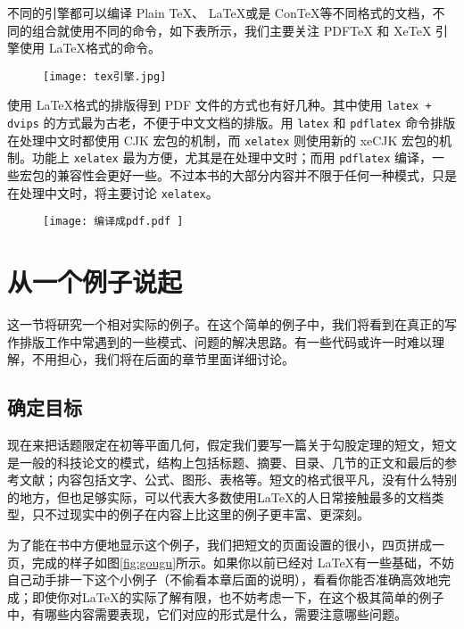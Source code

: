 {    \qquad 不同的引擎都可以编译 Plain \TeX 、 \LaTeX 或是 Con\TeX 等不同格式的文档，不同的组合就使用不同的命令，如下表所示，我们主要关注 PDFTeX 和 XeTeX 引擎使用 \LaTeX 格式的命令。

    \begin{figure}[H]
        \centering
        \texttt{[image: tex引擎.jpg]}
    \end{figure}

    \qquad 使用 \LaTeX 格式的排版得到 PDF 文件的方式也有好几种。其中使用 \lstinline{latex + dvips} 的方式最为古老，不便于中文文档的排版。用 \lstinline{latex} 和 \lstinline{pdflatex} 命令排版在处理中文时都使用 CJK 宏包的机制，而 \lstinline{xelatex} 则使用新的 xeCJK 宏包的机制。功能上 \lstinline{xelatex} 最为方便，尤其是在处理中文时；而用 \lstinline{pdflatex} 编译，一些宏包的兼容性会更好一些。不过本书的大部分内容并不限于任何一种模式，只是在处理中文时，将主要讨论 \lstinline{xelatex}。

    \begin{figure}[H]
        \centering
        \texttt{[image: 编译成pdf.pdf ]}
    \end{figure}
}

\section{从一个例子说起}

这一节将研究一个相对实际的例子。在这个简单的例子中，我们将看到在真正的写作排版工作中常遇到的一些模式、问题的解决思路。有一些代码或许一时难以理解，不用担心，我们将在后面的章节里面详细讨论。

\subsection{确定目标}

现在来把话题限定在初等平面几何，假定我们要写一篇关于勾股定理的短文，短文是一般的科技论文的模式，结构上包括标题、摘要、目录、几节的正文和最后的参考文献；内容包括文字、公式、图形、表格等。短文的格式很平凡，没有什么特别的地方，但也足够实际，可以代表大多数使用\LaTeX 的人日常接触最多的文档类型，只不过现实中的例子在内容上比这里的例子更丰富、更深刻。

为了能在书中方便地显示这个例子，我们把短文的页面设置的很小，四页拼成一页，完成的样子如图\ref{fig:gougu}所示。如果你以前已经对 \LaTeX 有一些基础，不妨自己动手排一下这个小例子（不偷看本章后面的说明），看看你能否准确高效地完成；即使你对\LaTeX 的实际了解有限，也不妨考虑一下，在这个极其简单的例子中，有哪些内容需要表现，它们对应的形式是什么，需要注意哪些问题。


